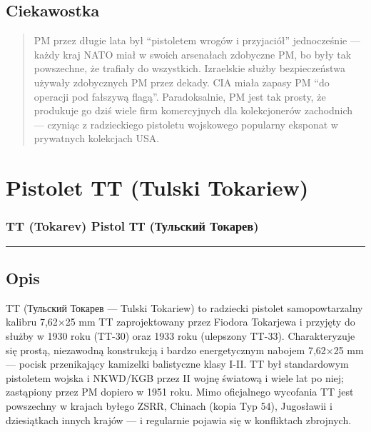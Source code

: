 \documentclass[12pt,openany,oneside]{book}
\begin{document}
\section{Ciekawostka}\label{ciekawostka-86}

\begin{quote}
PM przez długie lata był ``pistoletem wrogów i przyjaciół'' jednocześnie
--- każdy kraj NATO miał w swoich arsenałach zdobyczne PM, bo były tak
powszechne, że trafiały do wszystkich. Izraelskie służby bezpieczeństwa
używały zdobycznych PM przez dekady. CIA miała zapasy PM ``do operacji
pod fałszywą flagą''. Paradoksalnie, PM jest tak prosty, że produkuje go
dziś wiele firm komercyjnych dla kolekcjonerów zachodnich --- czyniąc z
radzieckiego pistoletu wojskowego popularny eksponat w prywatnych
kolekcjach USA.
\end{quote}

\chapter{Pistolet TT (Tulski
Tokariew)}\label{pistolet-tt-tulski-tokariew}

\subsection{TT (Tokarev) Pistol \textbar{} ТТ (Тульский
Токарев)}\label{tt-tokarev-pistol-ux442ux442-ux442ux443ux43bux44cux441ux43aux438ux439-ux442ux43eux43aux430ux440ux435ux432}

\begin{center}\rule{0.5\linewidth}{0.5pt}\end{center}

\section{Opis}\label{opis-87}

TT (Тульский Токарев --- Tulski Tokariew) to radziecki pistolet
samopowtarzalny kalibru 7,62×25 mm TT zaprojektowany przez Fiodora
Tokarjewa i przyjęty do służby w 1930 roku (TT-30) oraz 1933 roku
(ulepszony TT-33). Charakteryzuje się prostą, niezawodną konstrukcją i
bardzo energetycznym nabojem 7,62×25 mm --- pocisk przenikający
kamizelki balistyczne klasy I-II. TT był standardowym pistoletem wojska
i NKWD/KGB przez II wojnę światową i wiele lat po niej; zastąpiony przez
PM dopiero w 1951 roku. Mimo oficjalnego wycofania TT jest powszechny w
krajach byłego ZSRR, Chinach (kopia Typ 54), Jugosławii i dziesiątkach
innych krajów --- i regularnie pojawia się w konfliktach zbrojnych.
\end{document}
